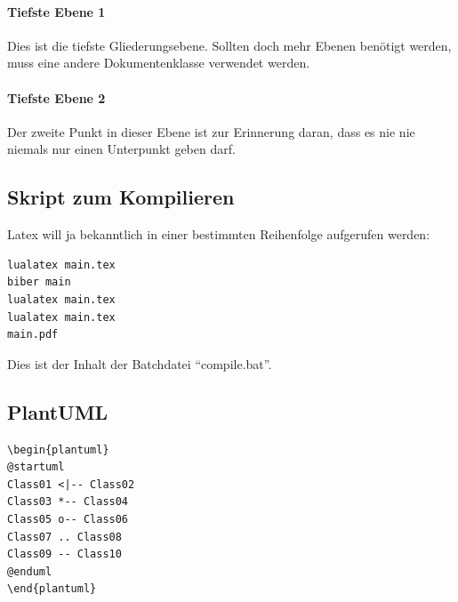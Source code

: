 \paragraph{Tiefste Ebene 1}
Dies ist die tiefste Gliederungsebene. Sollten doch mehr Ebenen benötigt werden, muss eine andere Dokumentenklasse verwendet werden.

\paragraph{Tiefste Ebene 2}
Der zweite Punkt in dieser Ebene ist zur Erinnerung daran, dass es nie nie niemals nur einen Unterpunkt geben darf.

\subsection{Skript zum Kompilieren}
Latex will ja bekanntlich in einer bestimmten Reihenfolge aufgerufen werden:
\begin{lstlisting}
lualatex main.tex
biber main
lualatex main.tex
lualatex main.tex
main.pdf
\end{lstlisting}

Dies ist der Inhalt der Batchdatei \enquote{compile.bat}.

\subsection{PlantUML}

\begin{lstlisting}
\begin{plantuml}
@startuml
Class01 <|-- Class02
Class03 *-- Class04
Class05 o-- Class06
Class07 .. Class08
Class09 -- Class10
@enduml
\end{plantuml}
\end{lstlisting}
